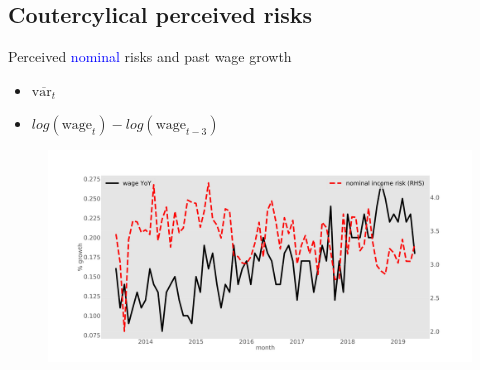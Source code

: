 \documentclass{beamer}
\begin{document}
\subsection{Coutercylical perceived risks}


\begin{frame}{Perceived \textcolor{blue}{nominal} risks and past wage growth}
	\begin{itemize}
		\item $\overline{\text{var}_{t}} $
\item  $log(\text{wage}_t) - log(\text{wage}_{t-3})$
\end{itemize}
	\begin{figure}
		\centering
		\label{ts_var}
		\includegraphics[width=\textwidth]{figures/tsMeanvar_he.jpg}
	\end{figure}
\end{frame}


\end{document}

